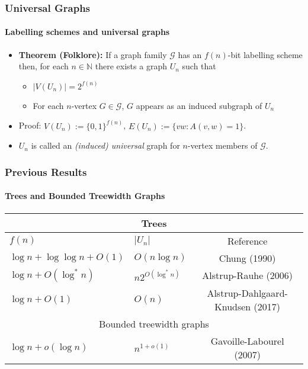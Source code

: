 \documentclass[xcolor=dvipsnames]{beamer}
\newcommand{\N}{\mathbb{N}}
\begin{document}
\begin{frame}
    \frametitle{Universal Graphs}
    \framesubtitle{Labelling schemes and universal graphs}

    \begin{itemize}
        \item<+->\textbf{Theorem (Folklore):}  If a graph family $\mathcal{G}$ has an $f(n)$-bit labelling scheme then, for each $n\in\N$ there exists a graph $U_n$ such that
        \begin{itemize}
            \item $|V(U_n)|=2^{f(n)}$
            \item For each $n$-vertex $G\in\mathcal{G}$, $G$ appears as an induced subgraph of $U_n$
        \end{itemize}
        \item<+->Proof: $V(U_n):=\{0,1\}^{f(n)}$, $E(U_n):=\{vw:A(v,w)=1\}$.
        \item<+->$U_n$ is called an \emph{(induced) universal} graph for $n$-vertex members of $\mathcal{G}$.
    \end{itemize}

\end{frame}


\begin{frame}
    \frametitle{Previous Results}
    \framesubtitle{Trees and Bounded Treewidth Graphs}

    \begin{center}
        \begin{tabular}{llc} \hline
            \multicolumn{3}{|c|}{Trees} \\ \hline
            $f(n)$ & $|U_n|$ & Reference  \\
            {$\log n+\log\log n+O(1)$} & $O(n\log n)$ & Chung (1990)   \\
            $\log n + O(\log^* n)$ & $n2^{O(\log^* n)}$ & Alstrup-Rauhe (2006) \\
            {$\log n + O(1)$} & $O(n)$ & Alstrup-Dahlgaard-Knudsen (2017) \\[2em] \hline
            \multicolumn{3}{|c|}{Bounded treewidth graphs} \\ \hline
            {$\log n + o(\log n)$} & $n^{1+o(1)}$ & Gavoille-Labourel (2007)
        \end{tabular}
    \end{center}
\end{frame}
\end{document}

